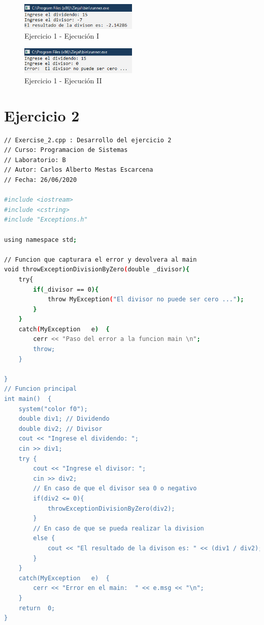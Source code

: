 \documentclass[12pt]{article}
\begin{document}
\begin{figure}[h]
    \centering
    \includegraphics[width=0.5\textwidth]{images/Capture01A.PNG}
    \caption{Ejercicio 1 - Ejecución I}
\end{figure}

\begin{figure}[h]
    \centering
    \includegraphics[width=0.5\textwidth]{images/Capture01B.PNG}
    \caption{Ejercicio 1 - Ejecución II}
\end{figure}



\section{Ejercicio 2}

\begin{lstlisting}[language=bash,frame=single,style=CStyle]
// Exercise_2.cpp : Desarrollo del ejercicio 2
// Curso: Programacion de Sistemas
// Laboratorio: B
// Autor: Carlos Alberto Mestas Escarcena
// Fecha: 26/06/2020

#include <iostream>
#include <cstring>	
#include "Exceptions.h"

using namespace std;

// Funcion que capturara el error y devolvera al main
void throwExceptionDivisionByZero(double _divisor){
	try{
		if(_divisor == 0){
			throw MyException("El divisor no puede ser cero ...");
		}
	}
	catch(MyException	e)	{
		cerr <<	"Paso del error a la funcion main \n";
		throw;
	}
	
}
// Funcion principal
int	main()	{
	system("color f0");
	double div1; // Dividendo
	double div2; // Divisor
	cout << "Ingrese el dividendo: ";
	cin >> div1;
	try	{
		cout << "Ingrese el divisor: ";
		cin >> div2;
		// En caso de que el divisor sea 0 o negativo
		if(div2 <= 0){
			throwExceptionDivisionByZero(div2);
		}
		// En caso de que se pueda realizar la division
		else {
			cout << "El resultado de la divison es: " << (div1 / div2);
		}
	}
	catch(MyException	e)	{
		cerr <<	"Error en el main:	" << e.msg << "\n";
	}
	return	0;
}
\end{lstlisting}
\end{document}
